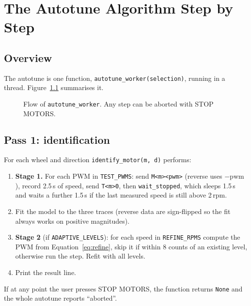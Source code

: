 \documentclass[11pt,a4paper]{report}
\newcommand{\code}[1]{\texttt{#1}}
\begin{document}
\chapter{The Autotune Algorithm Step by Step}

\section{Overview}
The autotune is one function, \code{autotune\_worker(selection)}, running in a thread. Figure~\ref{fig:flow} summarises it.

\begin{figure}[H]
\centering
{}
\caption{Flow of \code{autotune\_worker}. Any step can be aborted with STOP MOTORS.}\label{fig:flow}
\end{figure}

\section{Pass 1: identification}
For each wheel and direction \code{identify\_motor(m, d)} performs:
\begin{enumerate}[noitemsep]
  \item \textbf{Stage 1.} For each PWM in \code{TEST\_PWMS}: send \code{M<m><pwm>} (reverse uses $-\mathrm{pwm}$), record 2.5\,s of speed, send \code{T<m>0}, then \code{wait\_stopped}, which sleeps 1.5\,s and waits a further 1.5\,s if the last measured speed is still above 2\,rpm.
  \item Fit the model to the three traces (reverse data are sign-flipped so the fit always works on positive magnitudes).
  \item \textbf{Stage 2} (if \code{ADAPTIVE\_LEVELS}): for each speed in \code{REFINE\_RPMS} compute the PWM from Equation~\eqref{eq:refine}, skip it if within 8 counts of an existing level, otherwise run the step. Refit with all levels.
  \item Print the result line.
\end{enumerate}
If at any point the user presses STOP MOTORS, the function returns \code{None} and the whole autotune reports ``aborted''.
\end{document}
